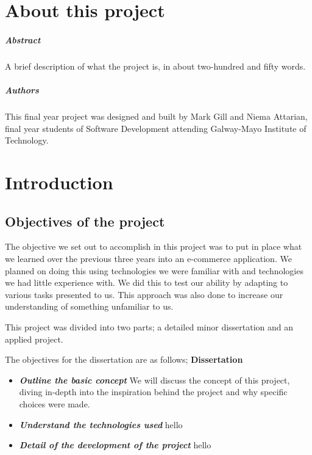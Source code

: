
\chapter*{About this project}
\paragraph{Abstract}
A brief description of what the project is, in about two-hundred and fifty words.

\paragraph{Authors}
This final year project was designed and built by Mark Gill and Niema Attarian, final year students of Software Development attending Galway-Mayo Institute of Technology.


\chapter{Introduction}

   
\section{Objectives of the project}
The objective we set out to accomplish in this project was to put in place what we learned over the previous three years into an e-commerce application. We planned on doing this using technologies we were familiar with and technologies we had little experience with. We did this to test our ability by adapting to various tasks presented to us. This approach was also done to increase our understanding of something unfamiliar to us.

This project was divided into two parts; a detailed minor dissertation and an applied project. 

The objectives for the dissertation are as follows;
\newline
\newline
\textbf{Dissertation}
\begin{itemize}
  \item \textbf{\textit{Outline the basic concept}} We will discuss the concept of this project, diving in-depth into the inspiration behind the project and why specific choices were made.
  \item \textbf{\textit{Understand the technologies used}} hello
  \item \textbf{\textit{Detail of the development of the project}} hello
\end{itemize}


